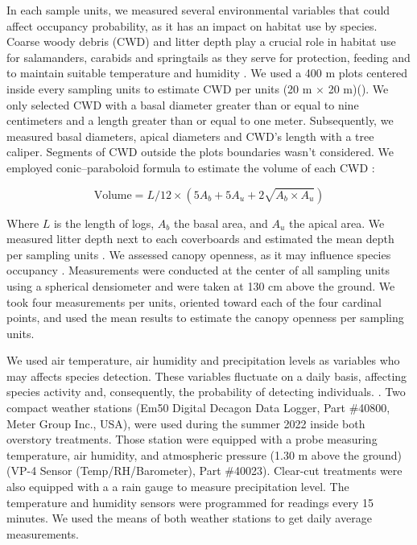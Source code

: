 In each sample units, we measured several environmental variables that could affect occupancy probability, as it has an impact on habitat use by species.
Coarse woody debris (CWD) and litter depth play a crucial role in habitat use for salamanders, carabids and springtails as
they serve for protection, feeding and to maintain suitable temperature and humidity \citep{birdChangesSoilLitter2004,groverInfluenceCoverMoisture1998a,harmonEcologyCoarseWoody1986,koivula.LeafLitterSmallscale1999,mckennyEffectsStructuralComplexity2006,patrickEffectsExperimentalForestry2006a}. 
We used a 400 m plots centered inside every sampling units to estimate CWD per units (20 m $\times$  20 m)(\citealp{methotGuideInventaireEchantillonnage2014}). 
We only selected CWD with a basal diameter greater than or equal to nine centimeters and a length greater than or equal to one meter.
Subsequently, we measured basal diameters, apical diameters and CWD's length with a tree caliper. 
Segments of CWD outside the plots boundaries wasn't considered.
We employed \cite{fraverRefiningVolumeEstimates2007} conic–paraboloid formula to estimate the volume of each CWD :

\begin{equation}
  \text{Volume} = L/12 \times (5A_b + 5A_u + 2\sqrt{A_b \times A_u})
\end{equation}


Where $L$ is the length of logs, $A_b$ the basal area, and $A_u$ the apical area.
We measured litter depth next to each coverboards and estimated the mean depth per sampling units \citep{mazerolleWoodlandSalamanderPopulation2021a}. 
We assessed canopy openness, as it may influence species occupancy \citep{henneronForestPlantCommunity2017,koivulaBorealCarabidbeetleColeoptera2002a,kotzeFortyYearsCarabid2011a,messereForestFloorDistribution1998,tilghmanMetaanalysisEffectsCanopy2012}.
Measurements were conducted at the center of all sampling units using a spherical densiometer \citep{lemmonSphericalDensiometerEstimating1956} and were taken at 130 cm above the ground. 
We took four measurements per units, oriented toward each of the four cardinal points, and used the mean results to estimate the canopy openness per sampling units.

We used air temperature, air humidity and precipitation levels as variables who may affects species detection.
These variables fluctuate on a daily basis, affecting species activity and, consequently, the probability of detecting individuals. 
\citep{butterfieldCarabidLifeCycle1996,kotzeFortyYearsCarabid2011a,loveiEcologyBehaviorGround1996,odonnellPredictingVariationMicrohabitat2014a,spotilaRoleTemperatureWater1972}.
Two compact weather stations (Em50 Digital Decagon Data Logger, Part \#40800, Meter Group Inc., USA), were used during the summer 2022 inside both overstory treatments.
Those station were equipped with a probe measuring temperature, air humidity, and atmospheric pressure (1.30 m above the ground)(VP-4 Sensor (Temp/RH/Barometer), Part \#40023). 
Clear-cut treatments were also equipped with a a rain gauge to measure precipitation level. 
The temperature and humidity sensors were programmed for readings every 15 minutes. 
We used the means of both weather stations to get daily average measurements.

